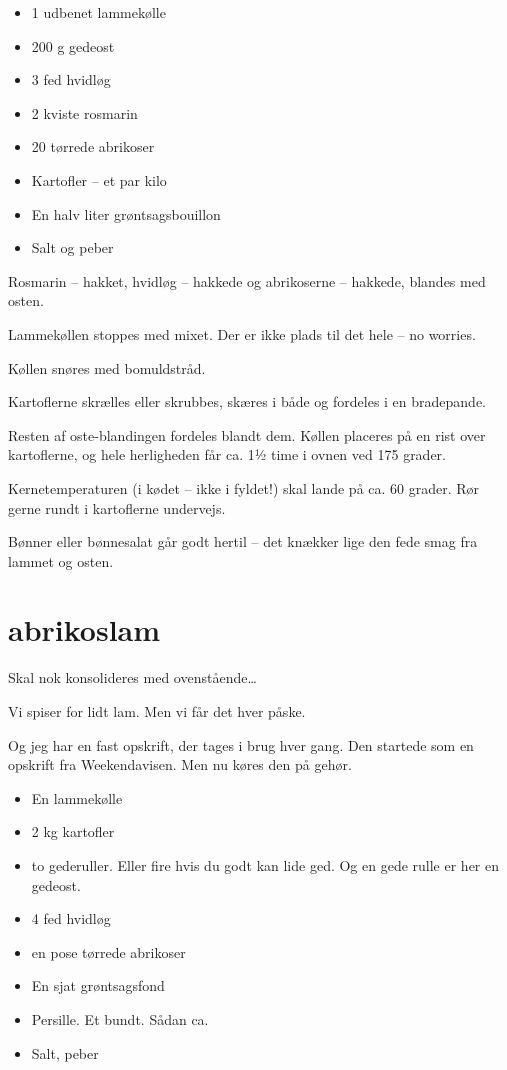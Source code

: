 \documentclass[
  letterpaper,
  DIV=11,
  numbers=noendperiod]{scrreprt}
\providecommand{\tightlist}{%
  \setlength{\itemsep}{0pt}\setlength{\parskip}{0pt}}\usepackage{longtable,booktabs,array}
\begin{document}
\begin{itemize}
\tightlist
\item
  1 udbenet lammekølle
\item
  200 g gedeost
\item
  3 fed hvidløg
\item
  2 kviste rosmarin
\item
  20 tørrede abrikoser
\item
  Kartofler -- et par kilo
\item
  En halv liter grøntsagsbouillon
\item
  Salt og peber
\end{itemize}

Rosmarin -- hakket, hvidløg -- hakkede og abrikoserne -- hakkede,
blandes med osten.

Lammekøllen stoppes med mixet. Der er ikke plads til det hele -- no
worries.

Køllen snøres med bomuldstråd.

Kartoflerne skrælles eller skrubbes, skæres i både og fordeles i en
bradepande.

Resten af oste-blandingen fordeles blandt dem. Køllen placeres på en
rist over kartoflerne, og hele herligheden får ca. 1½ time i ovnen ved
175 grader.

Kernetemperaturen (i kødet -- ikke i fyldet!) skal lande på ca. 60
grader. Rør gerne rundt i kartoflerne undervejs.

Bønner eller bønnesalat går godt hertil -- det knækker lige den fede
smag fra lammet og osten.

\hypertarget{abrikoslam}{%
\section{abrikoslam}\label{abrikoslam}}

Skal nok konsolideres med ovenstående\ldots{}

Vi spiser for lidt lam. Men vi får det hver påske.

Og jeg har en fast opskrift, der tages i brug hver gang. Den startede
som en opskrift fra Weekendavisen. Men nu køres den på gehør.

\begin{itemize}
\tightlist
\item
  En lammekølle
\item
  2 kg kartofler
\item
  to gederuller. Eller fire hvis du godt kan lide ged. Og en gede rulle
  er her en gedeost.
\item
  4 fed hvidløg
\item
  en pose tørrede abrikoser
\item
  En sjat grøntsagsfond
\item
  Persille. Et bundt. Sådan ca.
\item
  Salt, peber
\end{itemize}
\end{document}
